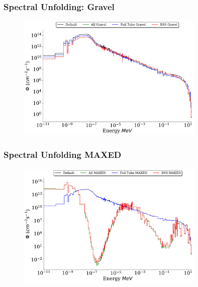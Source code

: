 \documentclass[fleqn]{beamer}
\begin{document}
\begin{frame}
\frametitle{Spectral Unfolding: Gravel}

\begin{figure}
\centering
\includegraphics[width = 0.8\textwidth]{unfolded_gr}
\caption{}
\end{figure}

\end{frame}

\begin{frame}
\frametitle{Spectral Unfolding MAXED}

\begin{figure}
\centering
\includegraphics[width = 0.8\textwidth]{unfolded_mx}
\caption{}
\end{figure}

\end{frame}
\end{document}
